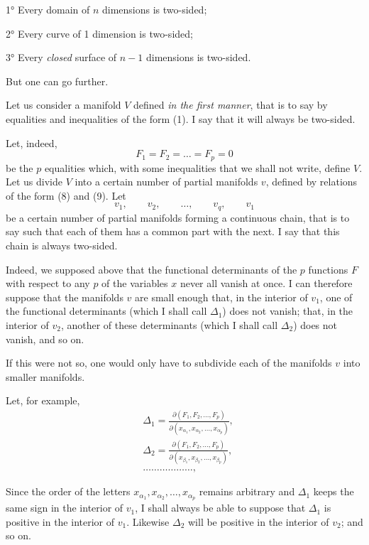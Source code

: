 \documentclass{article}
\begin{document}
1° Every domain of $n$ dimensions is two-sided;

2° Every curve of 1 dimension is two-sided;

3° Every \emph{closed} surface of $n - 1$ dimensions is two-sided.

But one can go further.

Let us consider a manifold $V$ defined \emph{in the first manner}, that is to say by equalities and inequalities of the form (1). I say that it will always be two-sided.

Let, indeed,
\[
F_{1} = F_{2} = \ldots = F_{p} = 0
\]
be the $p$ equalities which, with some inequalities that we shall not write, define $V$. Let us divide $V$ into a certain number of partial manifolds $v$, defined by relations of the form (8) and (9). Let
\[
v_{1}, \qquad v_{2}, \qquad \ldots, \qquad v_{q}, \qquad v_{1}
\]
be a certain number of partial manifolds forming a continuous chain, that is to say such that each of them has a common part with the next. I say that this chain is always two-sided.

Indeed, we supposed above that the functional determinants of the $p$ functions $F$ with respect to any $p$ of the variables $x$ never all vanish at once. I can therefore suppose that the manifolds $v$ are small enough that, in the interior of $v_{1}$, one of the functional determinants (which I shall call $\Delta_{1}$) does not vanish; that, in the interior of $v_{2}$, another of these determinants (which I shall call $\Delta_{2}$) does not vanish, and so on.

If this were not so, one would only have to subdivide each of the manifolds $v$ into smaller manifolds.

Let, for example,
\[
\begin{aligned}
&\Delta_{1} = \frac{\partial(F_{1}, F_{2}, \ldots, F_{p})}{\partial(x_{\alpha_{1}}, x_{\alpha_{2}}, \ldots, x_{\alpha_{p}})},\\
&\Delta_{2} = \frac{\partial(F_{1}, F_{2}, \ldots, F_{p})}{\partial(x_{\beta_{1}}, x_{\beta_{2}}, \ldots, x_{\beta_{p}})},\\
&\ldots\ldots\ldots\ldots\ldots\ldots,
\end{aligned}
\]

Since the order of the letters $x_{\alpha_{1}}, x_{\alpha_{2}}, \ldots, x_{\alpha_{p}}$ remains arbitrary and $\Delta_{1}$ keeps the same sign in the interior of $v_{1}$, I shall always be able to suppose that $\Delta_{1}$ is positive in the interior of $v_{1}$. Likewise $\Delta_{2}$ will be positive in the interior of $v_{2}$; and so on.
\end{document}
